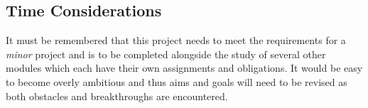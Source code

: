 \subsection{Time Considerations} It must be remembered that this project needs
to meet the requirements for a \textit{minor} project and is to be completed
alongside the study of several other modules which each have their own
assignments and obligations. It would be easy to become overly ambitious and
thus aims and goals will need to be revised as both obstacles and breakthroughs
are encountered.
